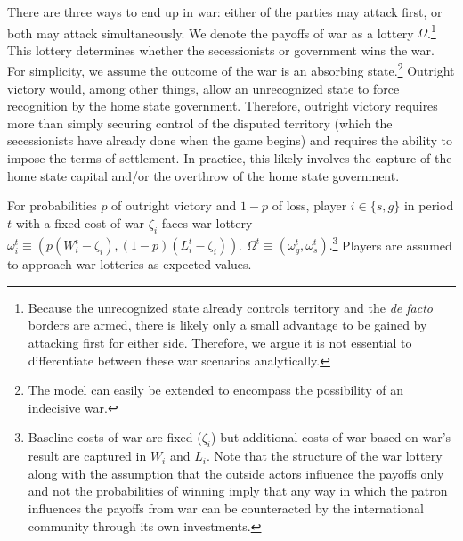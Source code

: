 \documentclass[11pt,letterpaper, notitlepage]{article}
\begin{document}
There are three ways to end up in war: either of the parties may attack first, or both may attack simultaneously. We denote the payoffs of war as a lottery $\Omega$.\footnote{Because the unrecognized state already controls territory and the \emph{de facto} borders are armed, there is likely only a small advantage to be gained by attacking first for either side. Therefore, we argue it is not essential to differentiate between these war scenarios analytically.} This lottery determines whether the secessionists or government wins the war. For simplicity, we assume the outcome of the war is an absorbing state.\footnote{The model can easily be extended to encompass the possibility of an indecisive war.} Outright victory would, among other things, allow an unrecognized state to force recognition by the home state government. Therefore, outright victory requires more than simply securing control of the disputed territory (which the secessionists have already done when the game begins) and requires the ability to impose the terms of settlement. In practice, this likely involves the capture of the home state capital and/or the overthrow of the home state government.

For probabilities $p$ of outright victory and $1-p$ of loss, player $i \in \{s, g\}$ in period $t$ with a fixed cost of war $\zeta_i$ faces war lottery $\omega_i^t \equiv (p (W_i^t-\zeta_i), \left(1-p\right)( L_i^t-\zeta_i))$. $\Omega^t \equiv (\omega_g^t, \omega_s^t).$\footnote{Baseline costs of war are fixed ($\zeta_i$) but additional costs of war based on war's result are captured in $W_i$ and $L_i$. Note that the structure of the war lottery along with the assumption that the outside actors influence the payoffs only and not the probabilities of winning imply that any way in which the patron influences the payoffs from war can be counteracted by the international community through its own investments.} Players are assumed to approach war lotteries as expected values.
\end{document}
